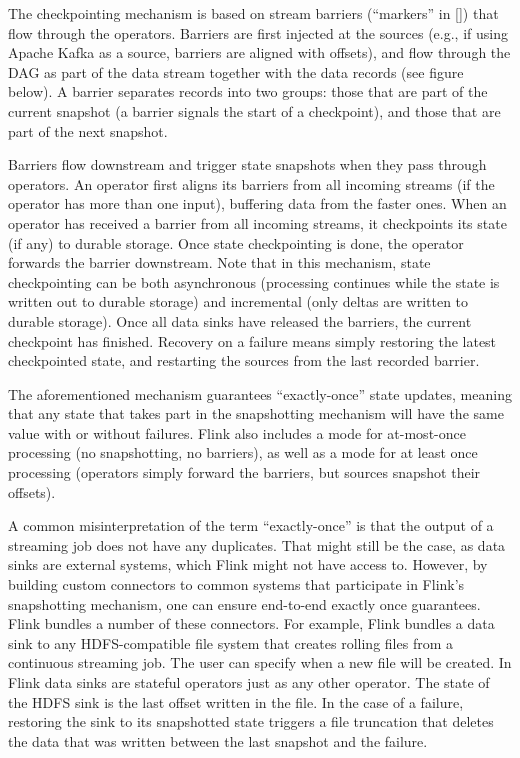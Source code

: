 \documentclass{sig-alternate}
\begin{document}
The checkpointing mechanism is based on stream barriers (“markers” in []) that flow through the operators. Barriers are first injected at the sources (e.g., if using Apache Kafka as a source, barriers are aligned with offsets), and flow through the DAG as part of the data stream together with the data records (see figure below). A barrier separates records into two groups: those that are part of the current snapshot (a barrier signals the start of a checkpoint), and those that are part of the next snapshot.



Barriers flow downstream and trigger state snapshots when they pass through operators. An operator first aligns its barriers from all incoming streams (if the operator has more than one input), buffering data from the faster ones. When an operator has received a barrier from all incoming streams, it checkpoints its state (if any) to durable storage. Once state checkpointing is done, the operator forwards the barrier downstream. Note that in this mechanism, state checkpointing can be both asynchronous (processing continues while the state is written out to durable storage) and incremental (only deltas are written to durable storage). Once all data sinks have released the barriers, the current checkpoint has finished. Recovery on a failure means simply restoring the latest checkpointed state, and restarting the sources from the last recorded barrier.

The aforementioned mechanism guarantees “exactly-once” state updates, meaning that any state that takes part in the snapshotting mechanism will have the same value with or without failures. Flink also includes a mode for at-most-once processing (no snapshotting, no barriers), as well as a mode for at least once processing (operators simply forward the barriers, but sources snapshot their offsets). 

A common misinterpretation of the term “exactly-once” is that the output of a streaming job does not have any duplicates. That might still be the case, as data sinks are external systems, which Flink might not have access to. However, by building custom connectors to common systems that participate in Flink’s snapshotting  mechanism, one can ensure end-to-end exactly once guarantees. Flink bundles a number of these connectors. For example, Flink bundles a data sink to any HDFS-compatible file system that creates rolling files from a continuous streaming job. The user can specify when a new file will be created. In Flink data sinks are stateful operators just as any other operator. The state of the HDFS sink is the last offset written in the file. In the case of a failure, restoring the sink to its snapshotted state triggers a file truncation that deletes the data that was written between the last snapshot and the failure. 
\end{document}
